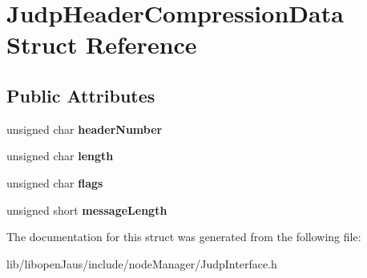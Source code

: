 \hypertarget{struct_judp_header_compression_data}{\section{\-Judp\-Header\-Compression\-Data \-Struct \-Reference}
\label{struct_judp_header_compression_data}
}
\subsection*{\-Public \-Attributes}
\begin{DoxyCompactItemize}
\item 
\hypertarget{struct_judp_header_compression_data_ac3dbfaa882bbc4b7a388a6ee116605c5}{unsigned char {\bfseries header\-Number}}\label{struct_judp_header_compression_data_ac3dbfaa882bbc4b7a388a6ee116605c5}

\item 
\hypertarget{struct_judp_header_compression_data_a304bea564d24d746d2739bdc624b0af0}{unsigned char {\bfseries length}}\label{struct_judp_header_compression_data_a304bea564d24d746d2739bdc624b0af0}

\item 
\hypertarget{struct_judp_header_compression_data_a0a3cde626cff8192d86ab0cd125fa21f}{unsigned char {\bfseries flags}}\label{struct_judp_header_compression_data_a0a3cde626cff8192d86ab0cd125fa21f}

\item 
\hypertarget{struct_judp_header_compression_data_aacc6a19b660575974f4b1dd2e35fb250}{unsigned short {\bfseries message\-Length}}\label{struct_judp_header_compression_data_aacc6a19b660575974f4b1dd2e35fb250}

\end{DoxyCompactItemize}


\-The documentation for this struct was generated from the following file\-:\begin{DoxyCompactItemize}
\item 
lib/libopen\-Jaus/include/node\-Manager/\-Judp\-Interface.\-h\end{DoxyCompactItemize}
